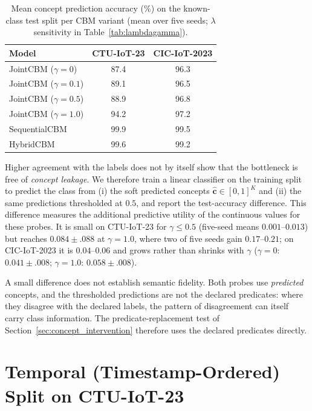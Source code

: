 \documentclass[journal]{IEEEtran}
\begin{document}
\begin{table}[!t]
\renewcommand{\arraystretch}{1.0}
\caption{Mean concept prediction accuracy (\%) on the known-class test split
per CBM variant (mean over five seeds; $\lambda$ sensitivity in
Table~\ref{tab:lambdagamma}).}
\label{tab:cbm_concepts}
\centering
\small
\begin{tabular}{lcc}
\toprule
\textbf{Model} & \textbf{CTU-IoT-23} & \textbf{CIC-IoT-2023} \\
\midrule
JointCBM ($\gamma{=}0$)   & 87.4 & 96.3 \\
JointCBM ($\gamma{=}0.1$) & 89.1 & 96.5 \\
JointCBM ($\gamma{=}0.5$) & 88.9 & 96.8 \\
JointCBM ($\gamma{=}1.0$) & 94.2 & 97.2 \\
SequentialCBM             & 99.9 & 99.5 \\
HybridCBM                 & 99.6 & 99.2 \\
\bottomrule
\end{tabular}
\end{table}

Higher agreement with the labels does not by itself show that the bottleneck is free of
\emph{concept leakage}. We therefore train a linear classifier on the
training split to predict the class from (i) the soft predicted concepts
$\hat{\mathbf{c}}\in[0,1]^K$ and (ii) the same predictions thresholded at $0.5$, and report
the test-accuracy difference. This difference measures the additional predictive utility
of the continuous values for these probes. It is small on CTU-IoT-23 for $\gamma{\le}0.5$
(five-seed means $0.001$--$0.013$) but reaches $0.084{\pm}.088$ at $\gamma{=}1.0$, where two of five
seeds gain $0.17$--$0.21$; on CIC-IoT-2023 it is $0.04$--$0.06$ and grows rather than shrinks with
$\gamma$ ($\gamma{=}0$: $0.041{\pm}.008$; $\gamma{=}1.0$: $0.058{\pm}.008$).

A small difference does not establish semantic fidelity. Both probes use \emph{predicted}
concepts, and the thresholded predictions are not the declared predicates: where they
disagree with the declared labels, the pattern of disagreement can itself carry class
information. The predicate-replacement test of Section~\ref{sec:concept_intervention}
therefore uses the declared predicates directly.

\section{Temporal (Timestamp-Ordered) Split on CTU-IoT-23}
\label{sec:temporal}
\end{document}
